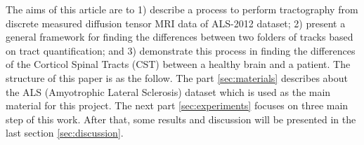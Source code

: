 The aims of this article are to 1) describe a process to perform tractography from discrete measured diffusion tensor MRI data of ALS-2012 dataset; 2) present a general framework for finding the differences between two folders of tracks based on tract quantification; and 3) demonstrate this process in finding the differences of the Corticol Spinal Tracts (CST) between a healthy brain and a patient. The structure of this paper is as the follow. The part \ref{sec:materials} describes about the ALS (Amyotrophic Lateral Sclerosis) dataset which is used as the main material for this project. The next part \ref{sec:experiments} focuses on three main step of this work. After that, some results and discussion will be presented in the last section \ref{sec:discussion}.
	


